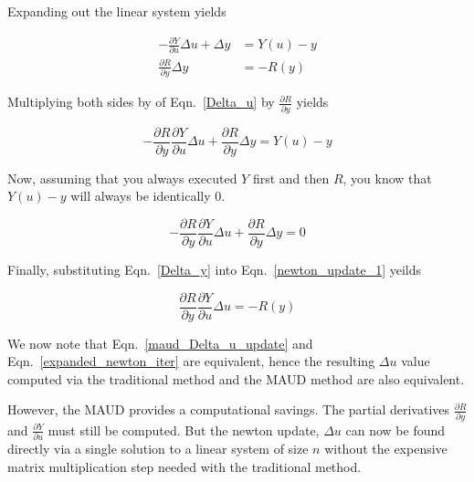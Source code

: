 \documentclass[12pt]{article}
\begin{document}
Expanding out the linear system yields

\begin{align}
  -\frac{\partial Y}{\partial u} \Delta u + \Delta y & = Y(u) - y   \label{Delta_u} \\
  \frac{\partial R}{\partial y} \Delta y & = -R(y)   \label{Delta_y}
\end{align}


Multiplying both sides by of Eqn.~\ref{Delta_u} by $\frac{\partial R}{\partial y}$ yields

\begin{equation}
  -\frac{\partial R}{\partial y} \frac{\partial Y}{\partial u} \Delta u + \frac{\partial R}{\partial y} \Delta y = Y(u) - y
\end{equation}

Now, assuming that you always executed $Y$ first and then $R$, you know that $Y(u) - y$ will always be identically 0.

\begin{equation}
  -\frac{\partial R}{\partial y} \frac{\partial Y}{\partial u} \Delta u + \frac{\partial R}{\partial y} \Delta y = 0
  \label{newton_update_1}
\end{equation}

Finally, substituting Eqn.~\ref{Delta_y} into Eqn.~\ref{newton_update_1} yeilds

\begin{equation}
  \frac{\partial R}{\partial y} \frac{\partial Y}{\partial u} \Delta u = -R(y)
  \label{maud_Delta_u_update}
\end{equation}

We now note that Eqn.~\ref{maud_Delta_u_update} and Eqn.~\ref{expanded_newton_iter} are equivalent, hence
the resulting $\Delta u$ value computed via the traditional method and the MAUD method are also
equivalent.

However, the MAUD provides a computational savings. The partial derivatives $\frac{\partial R}{\partial y}$
and $\frac{\partial Y}{\partial u}$ must still be computed. But the newton update, $\Delta u$ can now be found
directly via a single solution to a linear system of size $n$ without the expensive matrix
multiplication step needed with the traditional method.
\end{document}
